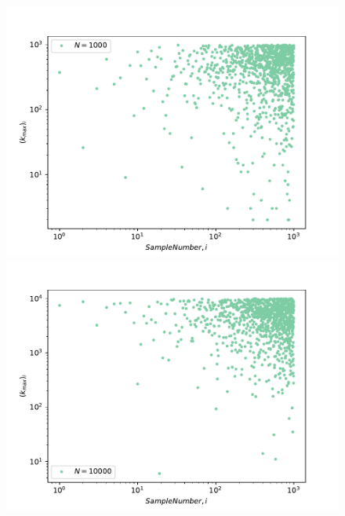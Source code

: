 \documentclass{article}
\begin{document}
\begin{figure}[H]
    \begin{minipage}{0.47\textwidth}
    \includegraphics[width=\linewidth]{Q06/kmaxVsSampleNumber_N1000.pdf}
    \end{minipage}
    \hspace{\fill} %
    \begin{minipage}{0.47\textwidth}
    \includegraphics[width=\linewidth]{Q06/kmaxVsSampleNumber_N10000.pdf}
    \end{minipage}
    
    \vspace*{0.20cm} %
    

\end{figure}
\end{document}
